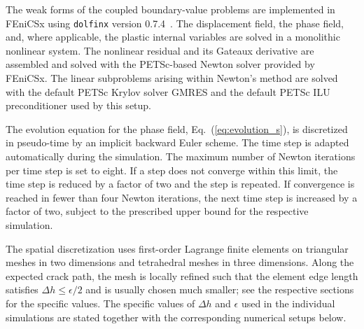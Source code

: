 \documentclass[pdflatex,sn-mathphys-num]{sn-jnl}%
\theoremstyle{thmstyleone}%
\theoremstyle{thmstyletwo}%
\theoremstyle{thmstylethree}%
\begin{document}
The weak forms of the coupled boundary-value problems are implemented in FEniCSx using \texttt{dolfinx} version 0.7.4~\cite{fenicsx_documentation}. The displacement field, the phase field, and, where applicable, the plastic internal variables are solved in a monolithic nonlinear system. The nonlinear residual and its Gateaux derivative are assembled and solved with the PETSc-based Newton solver provided by FEniCSx. The linear subproblems arising within Newton's method are solved with the default PETSc Krylov solver GMRES and the default PETSc ILU preconditioner used by this setup.

The evolution equation for the phase field, Eq.~(\ref{eq:evolution_s}), is discretized in pseudo-time by an implicit backward Euler scheme. The time step is adapted automatically during the simulation. The maximum number of Newton iterations per time step is set to eight. If a step does not converge within this limit, the time step is reduced by a factor of two and the step is repeated. If convergence is reached in fewer than four Newton iterations, the next time step is increased by a factor of two, subject to the prescribed upper bound for the respective simulation.

The spatial discretization uses first-order Lagrange finite elements on triangular meshes in two dimensions and tetrahedral meshes in three dimensions. Along the expected crack path, the mesh is locally refined such that the element edge length satisfies $\Delta h \leq \epsilon/2$ and is usually chosen much smaller; see the respective sections for the specific values. The specific values of $\Delta h$ and $\epsilon$ used in the individual simulations are stated together with the corresponding numerical setups below.
\end{document}
